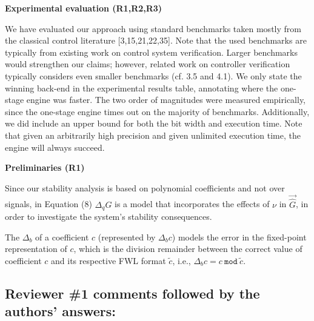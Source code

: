 \documentclass[11pt]{article}
\newcommand\vi{\vspace{\baselineskip}}
\begin{document}
\noindent \textbf{Experimental evaluation (R1,R2,R3)}

\noindent We have evaluated our approach using standard benchmarks taken mostly
from the classical control literature [3,15,21,22,35]. Note that the
used benchmarks are typically from existing work on control system
verification. Larger benchmarks would strengthen our claims; however,
related work on controller verification typically considers even
smaller benchmarks (cf. 3.5 and 4.1). We only state the winning
back-end in the experimental results table, annotating where the one-stage engine
was faster. The two order of magnitudes were measured empirically,
since the one-stage engine times out on the majority of
benchmarks. Additionally, we did include an upper bound for both the
bit width and execution time. Note that given an arbitrarily high precision and
given unlimited execution time, the engine will always succeed.

\noindent \textbf{Preliminaries (R1)}

\noindent Since our stability analysis is based on polynomial coefficients
and not over signals, in Equation (8) $\Delta_{q} G$ is a model that incorporates 
the effects of $\nu$ in $\vec{\hat{G}}$, in order to investigate the system's 
stability consequences.

\noindent The $\Delta_{b}$ of a coefficient $c$ (represented by $\Delta_{b}c$) models 
the error in the fixed-point representation of $c$, which is the division remainder 
between the correct value of coefficient $c$ and its respective FWL format $\tilde{c}$, 
i.e., $\Delta_{b}c=c~ \texttt{mod}~\tilde{c}$.



\newpage

\vi
\subsection*{Reviewer \#1 comments followed by the authors' answers:}
\end{document}
